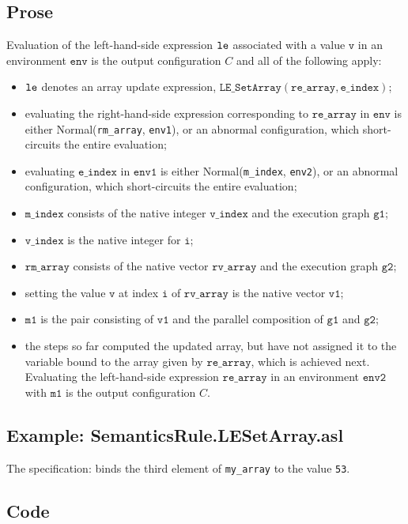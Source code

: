 \documentclass{book}
\newcommand\ProseOrAbnormal[0]{or an abnormal configuration, which short-circuits the entire evaluation}
\newcommand\Normal[0]{\textsf{Normal}}
\newcommand\env[0]{\texttt{env}}
\newcommand\envone[0]{\texttt{env1}}
\newcommand\envtwo[0]{\texttt{env2}}
\newcommand\vi[0]{\texttt{i}}
\newcommand\vv[0]{\texttt{v}}
\newcommand\vvone[0]{\texttt{v1}}
\newcommand\vmone[0]{\texttt{m1}}
\newcommand\vgone[0]{\texttt{g1}}
\newcommand\vgtwo[0]{\texttt{g2}}
\newcommand\eindex[0]{\texttt{e\_index}}
\newcommand\mindex[0]{\texttt{m\_index}}
\newcommand\vindex[0]{\texttt{v\_index}}
\newcommand\rearray[0]{\texttt{re\_array}}
\newcommand\rvarray[0]{\texttt{rv\_array}}
\newcommand\rmarray[0]{\texttt{rm\_array}}
\begin{document}
  \subsection{Prose}
  Evaluation of the left-hand-side expression $\texttt{le}$ associated with a
  value $\vv$ in an environment $\env$ is the output configuration $C$
  and all of the following apply:
  \begin{itemize}
  \item $\texttt{le}$ denotes an array update expression, $\texttt{LE\_SetArray}(\rearray, \eindex)$;
  \item evaluating the right-hand-side expression corresponding to $\rearray$ in $\env$
  is either \Normal(\rmarray, \envone), \ProseOrAbnormal;
  \item evaluating $\eindex$ in $\envone$ is either \Normal(\mindex, \envtwo), \ProseOrAbnormal;
  \item $\mindex$ consists of the native integer $\vindex$ and the execution graph $\vgone$;
  \item $\vindex$ is the native integer for $\vi$;
  \item $\rmarray$ consists of the native vector $\rvarray$ and the execution graph $\vgtwo$;
  \item setting the value $\vv$ at index $\vi$ of $\rvarray$ is the native vector $\vvone$;
  \item $\vmone$ is the pair consisting of $\vvone$ and the parallel composition of $\vgone$ and $\vgtwo$;
  \item the steps so far computed the updated array, but have not assigned it to the variable
  bound to the array given by $\rearray$, which is achieved next.
  Evaluating the left-hand-side expression $\rearray$ in an environment $\envtwo$ with $\vmone$
  is the output configuration $C$.
  \end{itemize}

  \subsection{Example: SemanticsRule.LESetArray.asl}
  The specification:
  binds the third element of \texttt{my\_array} to the value \texttt{53}.

  \subsection{Code}
\end{document}

